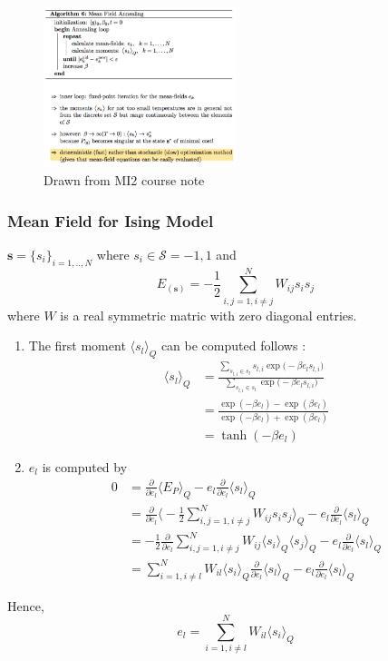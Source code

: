\begin{figure}[hbt]
	\center
  \includegraphics[width=0.5\textwidth]{figures/so-mean-field-algo}
  \caption{Drawn from MI2 course note }
  \label{fig:so-transition-probability}
\end{figure}

\subsubsection{Mean Field for Ising Model}
$\boldsymbol{s}  = \{ s_i \}_{i = 1, .. , N} $ where $s_i \in \mathcal{S} ={-1,1}$ and 
$$E_{(\boldsymbol{s})}  = -\frac{1}{2} \sum_{i,j = 1, i \ne j }^{N}  W_{ij} s_i s_j$$
where $W$ is a real symmetric matric with zero diagonal entries.

\begin{enumerate}
	\item The first moment $\langle s_l \rangle_Q$ can be computed follows : 
	\begin{align*}
\langle s_l \rangle_Q &=		 \frac{ \sum_{s_{l,i} \in s_l} s_{l,i} \exp{ \bigg ( -\beta e_l s_{l,i} \bigg)} }{ \sum_{s_{l,i} \in s_l} \exp{ \bigg ( -\beta e_l s_{l,i} \bigg)} }  \\
&= \frac{  \exp{  ( -\beta e_l  )} - \exp{  ( \beta e_l  )} }{ \exp{  ( -\beta e_l  )}  + \exp{  ( \beta e_l  )}}  \\
&= \tanh ( -\beta e_l )
	\end{align*}
	\item $e_l$ is computed by 
\begin{align*}
0 &=	\frac{\partial}{\partial e_l} \langle E_P \rangle_Q  -   e_l \frac{\partial}{\partial e_l} \langle  s_l \rangle_Q \\
&=	\frac{\partial}{\partial e_l} \bigg \langle -\frac{1}{2} \sum_{i,j = 1, i \ne j }^{N}  W_{ij} s_i s_j \bigg \rangle_Q  -   e_l \frac{\partial}{\partial e_l} \langle  s_l \rangle_Q  \\
&=	-\frac{1}{2} \frac{\partial}{\partial e_l}   \sum_{i,j = 1, i \ne j }^{N}  W_{ij} \langle s_i \rangle_Q \langle s_j  \rangle_Q  -   e_l \frac{\partial}{\partial e_l} \langle  s_l \rangle_Q  \\
&= \sum_{i = 1, i \ne l }^{N}  W_{il} \langle s_i \rangle_Q \frac{\partial}{\partial e_l} \langle s_l  \rangle_Q  -   e_l \frac{\partial}{\partial e_l} \langle  s_l \rangle_Q 
\end{align*}
\end{enumerate}
Hence, 
$$
e_l = \sum_{i = 1, i \ne l }^{N}  W_{il} \langle s_i \rangle_Q
$$